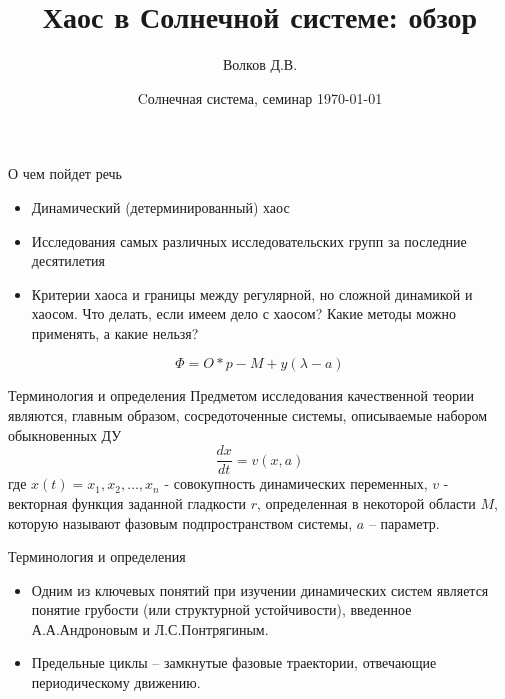 \documentclass{beamer}
\begin{document}
\title{Хаос в Солнечной системе: обзор}  
\author{Волков Д.В.}
\date{Cолнечная система, семинар \today} 
\frame{\titlepage} 

\begin{frame}{О чем пойдет речь}
        \begin{itemize}
		\item Динамический (детерминированный) хаос 
		\item Исследования самых различных исследовательских групп за последние десятилетия 
		\item Критерии хаоса и границы между регулярной, но сложной динамикой и хаосом. Что делать, если имеем дело с хаосом? Какие методы можно применять, а какие нельзя?
	\end{itemize}

	\begin{equation}
		\Phi = O * p - M + y (\lambda - a)
	\end{equation}
\end{frame}

\begin{frame}{Терминология и определения}
Предметом исследования качественной теории являются, главным образом, сосредоточенные системы, описываемые набором обыкновенных ДУ
\begin{equation}
        \frac{dx}{dt} = v(x, a)
\end{equation}
где $x(t) = {x_1, x_2, \ldots, x_n}$ - совокупность динамических переменных, $v$ - векторная функция заданной гладкости $r$, определенная в некоторой области $M$, которую называют фазовым подпространством системы, $a$ -- параметр.
\end{frame}


\begin{frame}{Терминология и определения}
\begin{itemize}
        \item        Одним из ключевых понятий при изучении динамических систем является понятие грубости (или структурной устойчивости), введенное А.А.Андроновым и Л.С.Понтрягиным. 
        \item Предельные циклы -- замкнутые фазовые траектории, отвечающие периодическому движению.

\end{itemize}
\end{frame}
\end{document}
